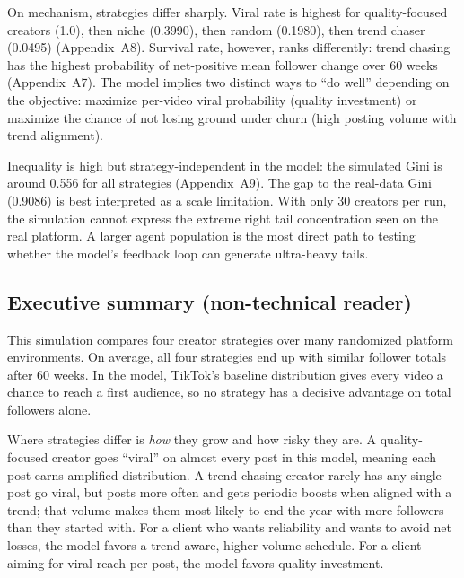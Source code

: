 \documentclass[10pt]{article}
\newcommand{\appref}[1]{(Appendix~#1)}
\begin{document}
On mechanism, strategies differ sharply. Viral rate is highest for quality-focused creators (1.0), then niche (0.3990), then random (0.1980), then trend chaser (0.0495) \appref{A8}. Survival rate, however, ranks differently: trend chasing has the highest probability of net-positive mean follower change over 60 weeks \appref{A7}. The model implies two distinct ways to ``do well'' depending on the objective: maximize per-video viral probability (quality investment) or maximize the chance of not losing ground under churn (high posting volume with trend alignment).

Inequality is high but strategy-independent in the model: the simulated Gini is around 0.556 for all strategies \appref{A9}. The gap to the real-data Gini (0.9086) is best interpreted as a scale limitation. With only 30 creators per run, the simulation cannot express the extreme right tail concentration seen on the real platform. A larger agent population is the most direct path to testing whether the model's feedback loop can generate ultra-heavy tails.

\subsection{Executive summary (non-technical reader)}
This simulation compares four creator strategies over many randomized platform environments. On average, all four strategies end up with similar follower totals after 60 weeks. In the model, TikTok's baseline distribution gives every video a chance to reach a first audience, so no strategy has a decisive advantage on total followers alone.

Where strategies differ is \emph{how} they grow and how risky they are. A quality-focused creator goes ``viral'' on almost every post in this model, meaning each post earns amplified distribution. A trend-chasing creator rarely has any single post go viral, but posts more often and gets periodic boosts when aligned with a trend; that volume makes them most likely to end the year with more followers than they started with. For a client who wants reliability and wants to avoid net losses, the model favors a trend-aware, higher-volume schedule. For a client aiming for viral reach per post, the model favors quality investment.
\end{document}
